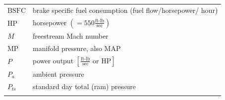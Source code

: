 \documentclass[
]{book}
\begin{document}
\begin{longtable}[]{@{}ll@{}}
\begin{minipage}[t]{0.13\columnwidth}
\(\mathrm{BSFC}\)\strut
\end{minipage} & \begin{minipage}[t]{0.81\columnwidth}\raggedright
brake specific fuel consumption (fuel flow/horsepower/ hour)\strut
\end{minipage}\tabularnewline
\begin{minipage}[t]{0.13\columnwidth}\raggedright
\(\mathrm{HP}\)\strut
\end{minipage} & \begin{minipage}[t]{0.81\columnwidth}\raggedright
horsepower \(\left( = 550 \frac{\text{ft-lb}}{\text{sec}} \right)\)\strut
\end{minipage}\tabularnewline
\begin{minipage}[t]{0.13\columnwidth}\raggedright
\(M\)\strut
\end{minipage} & \begin{minipage}[t]{0.81\columnwidth}\raggedright
freestream Mach number\strut
\end{minipage}\tabularnewline
\begin{minipage}[t]{0.13\columnwidth}\raggedright
\(\mathrm{MP}\)\strut
\end{minipage} & \begin{minipage}[t]{0.81\columnwidth}\raggedright
manifold pressure, also \(\mathrm{MAP}\)\strut
\end{minipage}\tabularnewline
\begin{minipage}[t]{0.13\columnwidth}\raggedright
\(P\)\strut
\end{minipage} & \begin{minipage}[t]{0.81\columnwidth}\raggedright
power output \(\left[ \frac{\text{ft-lb}}{\text{sec}} \text{ or HP} \right]\)\strut
\end{minipage}\tabularnewline
\begin{minipage}[t]{0.13\columnwidth}\raggedright
\(P_a\)\strut
\end{minipage} & \begin{minipage}[t]{0.81\columnwidth}\raggedright
ambient pressure\strut
\end{minipage}\tabularnewline
\begin{minipage}[t]{0.13\columnwidth}\raggedright
\(P_{ts}\)\strut
\end{minipage} & \begin{minipage}[t]{0.81\columnwidth}\raggedright
standard day total (ram) pressure\strut
\end{minipage}\tabularnewline
\begin{minipage}[t]{0.13\columnwidth}\raggedright

\end{minipage}
\end{longtable}
\end{document}
